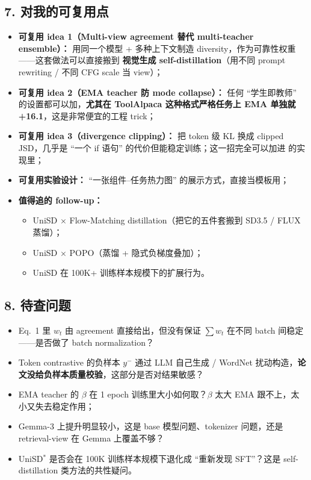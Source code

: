 \subsection{7. 对我的可复用点}

\begin{itemize}[leftmargin=1.5em]
  \item \textbf{可复用 idea 1（Multi-view agreement 替代 multi-teacher ensemble）：} 用同一个模型 + 多种上下文制造 diversity，作为可靠性权重——这套做法可以直接搬到 \textbf{视觉生成 self-distillation}（用不同 prompt rewriting / 不同 CFG scale 当 view）；
  \item \textbf{可复用 idea 2（EMA teacher 防 mode collapse）：} 任何 ``学生即教师'' 的设置都可以加，\textbf{尤其在 ToolAlpaca 这种格式严格任务上 EMA 单独就 +16.1}，这是非常便宜的工程 trick；
  \item \textbf{可复用 idea 3（divergence clipping）：} 把 token 级 KL 换成 clipped JSD，几乎是 ``一个 if 语句'' 的代价但能稳定训练；这一招完全可以加进  的实现里；
  \item \textbf{可复用实验设计：} ``一张组件--任务热力图'' 的展示方式，直接当模板用；
  \item \textbf{值得追的 follow-up：}
    \begin{itemize}[leftmargin=1.5em]
      \item UniSD $\times$ Flow-Matching distillation（把它的五件套搬到 SD3.5 / FLUX 蒸馏）；
      \item UniSD $\times$ POPO（蒸馏 + 隐式负梯度叠加）；
      \item UniSD 在 100K+ 训练样本规模下的扩展行为。
    \end{itemize}
\end{itemize}

\subsection{8. 待查问题}

\begin{itemize}[leftmargin=1.5em]
  \item Eq.~1 里 $w_t$ 由 agreement 直接给出，但没有保证 $\sum w_t$ 在不同 batch 间稳定——是否做了 batch normalization？
  \item Token contrastive 的负样本 $y^-$ 通过 LLM 自己生成 / WordNet 扰动构造，\textbf{论文没给负样本质量校验}，这部分是否对结果敏感？
  \item EMA teacher 的 $\beta$ 在 1 epoch 训练里大小如何取？$\beta$ 太大 EMA 跟不上，太小又失去稳定作用；
  \item Gemma-3 上提升明显较小，这是 base 模型问题、tokenizer 问题，还是 retrieval-view 在 Gemma 上覆盖不够？
  \item UniSD$^{*}$ 是否会在 100K 训练样本规模下退化成 ``重新发现 SFT''？这是 self-distillation 类方法的共性疑问。
\end{itemize}

